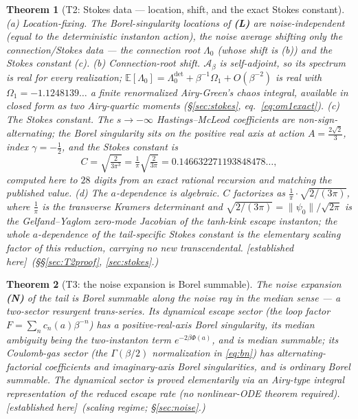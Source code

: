 \documentclass[11pt,reqno]{amsart}
\theoremstyle{plain}
\newtheorem{theorem}{Theorem}
\theoremstyle{definition}
\theoremstyle{remark}
\newcommand{\E}{\mathbb{E}}
\newcommand{\SAO}{\mathcal{A}_\beta}
\newcommand{\tagPr}{{\footnotesize\textsf{[established here]}}}
\begin{document}
\begin{theorem}[T2: Stokes data --- location, shift, and the exact Stokes constant]\label{thm:T2}
\emph{(a) Location-fixing.} The Borel-singularity locations of \textbf{(L)} are noise-independent
(equal to the deterministic instanton action), the noise average shifting only the connection/Stokes
data --- the connection root $\Lambda_0$ (whose shift is (b)) and the Stokes constant (c).
\emph{(b) Connection-root shift.} $\SAO$ is self-adjoint, so its spectrum is real for every
realization; $\E[\Lambda_0]=\Lambda_0^{\det}+\beta^{-1}\Omega_1+O(\beta^{-2})$ is real with
$\Omega_1=-1.1248139\ldots$ a finite renormalized Airy-Green's chaos integral, available in closed
form as two Airy-quartic moments (\S\ref{sec:stokes}, eq.~\eqref{eq:om1exact}).
\emph{(c) The Stokes constant.} The $s\to-\infty$ Hastings--McLeod coefficients are
non-sign-alternating; the Borel singularity sits on the positive real axis at action
$A=\tfrac{2\sqrt2}{3}$, index $\gamma=-\tfrac12$, and the Stokes constant is
\[
C=\sqrt{\tfrac{2}{3\pi^3}}=\tfrac1\pi\sqrt{\tfrac{2}{3\pi}}=0.146632271193848478\ldots,
\]
computed here to $28$ digits from an exact rational recursion and matching the published value.
\emph{(d) The $a$-dependence is algebraic.} $C$ factorizes as $\tfrac1\pi\cdot\sqrt{2/(3\pi)}$, where
$\tfrac1\pi$ is the transverse Kramers determinant and $\sqrt{2/(3\pi)}=\lVert\psi_0\rVert/\sqrt{2\pi}$
is the Gelfand--Yaglom zero-mode Jacobian of the tanh-kink escape instanton; the whole $a$-dependence
of the tail-specific Stokes constant is the elementary scaling factor of this reduction, carrying no
new transcendental. \tagPr\ \emph{(\S\S\ref{sec:T2proof}, \ref{sec:stokes}.)}
\end{theorem}

\begin{theorem}[T3: the noise expansion is Borel summable]\label{thm:T3}
The noise expansion \textbf{(N)} of the tail is Borel summable along the noise ray in the median
sense --- a two-sector resurgent trans-series. Its \emph{dynamical escape} sector (the loop factor
$F=\sum_n c_n(a)\beta^{-n}$) has a positive-real-axis Borel singularity, its median ambiguity being
the two-instanton term $e^{-2\beta\Phi(a)}$, and is median summable; its \emph{Coulomb-gas} sector (the $\Gamma(\beta/2)$ normalization
in \eqref{eq:bn}) has alternating-factorial coefficients and imaginary-axis Borel singularities, and
is ordinary Borel summable. The dynamical sector is proved elementarily via an Airy-type integral
representation of the reduced escape rate (no nonlinear-ODE theorem required).
\tagPr\ \emph{(scaling regime; \S\ref{sec:noise}.)}
\end{theorem}
\end{document}
